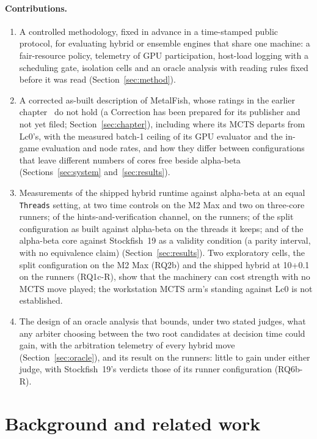 \documentclass{article}
\newcommand{\MF}{MetalFish}
\begin{document}
\paragraph{Contributions.}
\begin{enumerate}
  \item A controlled methodology, fixed in advance in a time-stamped public protocol, for evaluating hybrid or ensemble engines that share one machine: a fair-resource policy, telemetry of GPU participation, host-load logging with a scheduling gate, isolation cells and an oracle analysis with reading rules fixed before it was read (Section~\ref{sec:method}).
  \item A corrected as-built description of \MF{}, whose ratings in the earlier chapter~\cite{niketan2026chapter} do not hold (a Correction has been prepared for its publisher and not yet filed; Section~\ref{sec:chapter}), including where its MCTS departs from Lc0's, with the measured batch-1 ceiling of its GPU evaluator and the in-game evaluation and node rates, and how they differ between configurations that leave different numbers of cores free beside alpha-beta (Sections~\ref{sec:system} and~\ref{sec:results}).
  \item Measurements of the shipped hybrid runtime against alpha-beta at an equal \texttt{Threads} setting, at two time controls on the M2 Max and two on three-core runners; of the hints-and-verification channel, on the runners; of the split configuration as built against alpha-beta on the threads it keeps; and of the alpha-beta core against Stockfish~19 as a validity condition (a parity interval, with no equivalence claim) (Section~\ref{sec:results}). Two exploratory cells, the split configuration on the M2 Max (RQ2b) and the shipped hybrid at 10+0.1 on the runners (RQ1c-R), show that the machinery can cost strength with no MCTS move played; the workstation MCTS arm's standing against Lc0 is not established.
  \item The design of an oracle analysis that bounds, under two stated judges, what any arbiter choosing between the two root candidates at decision time could gain, with the arbitration telemetry of every hybrid move (Section~\ref{sec:oracle}), and its result on the runners: little to gain under either judge, with Stockfish~19's verdicts those of its runner configuration (RQ6b-R).
\end{enumerate}

\section{Background and related work}
\label{sec:background}
\end{document}
